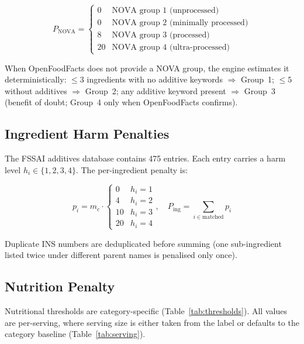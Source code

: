 \documentclass[conference]{IEEEtran}
\begin{document}
\begin{equation}
P_{\text{NOVA}} = \begin{cases} 0  & \text{NOVA group } 1 \text{ (unprocessed)} \\ 0  & \text{NOVA group } 2 \text{ (minimally processed)} \\ 8  & \text{NOVA group } 3 \text{ (processed)} \\ 20 & \text{NOVA group } 4 \text{ (ultra-processed)} \end{cases}
\label{eq:nova}
\end{equation}

When OpenFoodFacts does not provide a NOVA group, the engine estimates it
deterministically: $\leq\!3$ ingredients with no additive keywords $\Rightarrow$ Group~1;
$\leq\!5$ without additives $\Rightarrow$ Group~2; any additive keyword present
$\Rightarrow$ Group~3 (benefit of doubt; Group~4 only when OpenFoodFacts confirms).

\subsection{Ingredient Harm Penalties}

The FSSAI additives database contains 475 entries. Each entry carries a
harm level $h_i \in \{1,2,3,4\}$.
The per-ingredient penalty is:

\begin{equation}
p_i = m_c \cdot \begin{cases} 0  & h_i = 1 \\ 4  & h_i = 2 \\ 10 & h_i = 3 \\ 20 & h_i = 4 \end{cases}, \quad P_{\text{ing}} = \sum_{i \in \text{matched}} p_i
\label{eq:ing}
\end{equation}

Duplicate INS numbers are deduplicated before summing (one sub-ingredient listed
twice under different parent names is penalised only once).

\subsection{Nutrition Penalty}

Nutritional thresholds are category-specific (Table~\ref{tab:thresholds}).
All values are per-serving, where serving size is either taken from the label
or defaults to the category baseline (Table~\ref{tab:serving}).
\end{document}
